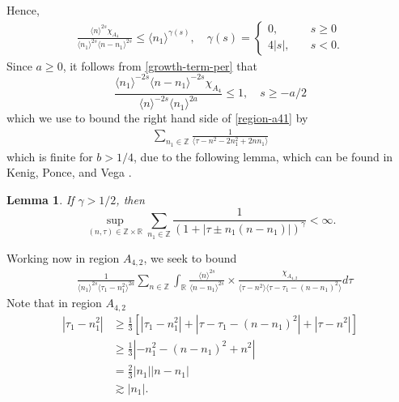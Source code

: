 \documentclass[12pt,reqno]{amsart}
\numberwithin{equation}{section}  %
\numberwithin{figure}{section}
\newcommand{\rr}{\mathbb{R}}
\newcommand{\zz}{\mathbb{Z}}
\theoremstyle{plain}
\newtheorem{lemma}{Lemma}
\theoremstyle{definition}
\theoremstyle{remark}
\begin{document}
%
Hence,
%
\begin{equation}
  \label{growth-term-per}
\begin{split}
  \frac{\langle n \rangle ^{2s} \chi_{A_{4}}}{\langle n_{1} \rangle ^{2s} \langle n -
  n_{1} \rangle ^{2s}} \le \langle n_{1} \rangle ^{\gamma(s)},
  \quad 
  \gamma(s) = 
  \begin{cases} 0, \quad & s \ge 0
    \\
    4|s|, \quad & s < 0.
  \end{cases}
\end{split}
\end{equation}
%
%
%
%
Since $a \ge 0$, it follows from \eqref{growth-term-per} that 
%
\begin{equation}
  \label{growth-term-control-per}
  \frac{\langle n_1 \rangle ^{-2s} \langle n - n_{1} \rangle
  ^{-2s}\chi_{A_{4}}}{\langle
n \rangle ^{-2s} \langle n_{1} \rangle
^{2a}} \le 1, \quad s \ge -a/2
\end{equation}
%
%
which we use to bound the right hand side of \eqref{region-a41} by
%
%
\begin{equation*}
\begin{split}
\sum_{n_{1} \in
\zz} 
\frac{1}{\langle \tau - n^{2} - 2n_{1}^{2} + 2nn_{1}  \rangle }
\end{split}
\end{equation*}
%
%
%
which is finite for $b > 1/4$, due to the following lemma, which can be found in
Kenig, Ponce, and Vega
\cite{Kenig-Ponce-Vega-1996-Quadratic-forms-for-the-1-D-semilinear}.
\begin{lemma}
  \label{lem:sum-estimate}
If $\gamma>1/2$, then
\begin{equation}\label{CI2}
\sup_{(n,\tau)\in \zz \times \rr}\sum_{n_1\in \zz}\frac{1}{(1+|\tau\pm
n_1(n-n_1)|)^{\gamma}}<\infty. 
\end{equation}
\end{lemma}
%
Working now in region $A_{4,2}$, we seek to bound 
\begin{equation}
  \label{region-4-2}
\begin{split}
  &  \frac{1}{\langle n_{1} \rangle ^{2s}
  \langle \tau_{1} - n_{1}^{2} \rangle
  ^{2a}} \sum_{n \in \zz} \int_{\rr} \frac{\langle n \rangle ^{2s}}{\langle
  n - n_{1}\rangle ^{2s}}  \times \frac{\chi_{A_{4,2}}}{\langle
  \tau - n^{2} \rangle  \langle \tau - \tau_{1} - (n - n_{1})^{2} \rangle } d \tau 
\end{split}
\end{equation}
%
%
Note that in region $A_{4,2}$
\begin{equation}
  \label{smoothing-per-4-2}
\begin{split}
  | \tau_{1} - n_{1}^{2} |
  & \ge \frac{1}{3}\left[ | \tau_{1} - n_{1}^{2} | + | \tau -
  \tau_{1} - (n - n_{1})^{2}
  | + | \tau - n^{2} | \right]
  \\
  & \ge \frac{1}{3} | - n_{1}^{2} - (n - n_{1})^{2} + n^{2} |
  \\
  & = \frac{2}{3} | n_{1} | | n - n_{1} |
  \\
  & \gtrsim | n_{1} |.
\end{split}
\end{equation}
\end{document}
